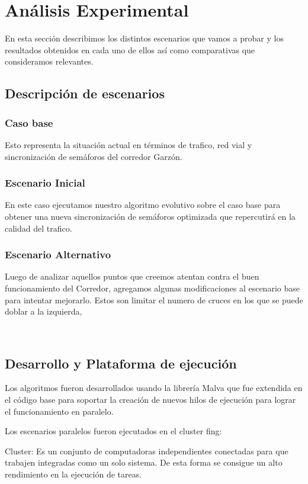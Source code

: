 \chapter{Análisis Experimental}
En esta sección describimos los distintos escenarios que vamos a probar y los resultados obtenidos en cada uno de ellos así como comparativas que consideramos relevantes.

\section{Descripción de escenarios}

\subsection{Caso base}
Esto representa la situación actual en términos de trafico, red vial y sincronización de semáforos del corredor Garzón. 

\subsection{Escenario Inicial }
En este caso ejecutamos nuestro algoritmo evolutivo sobre el caso base para obtener una nueva sincronización de semáforos optimizada que repercutirá en la calidad del trafico.

\subsection{Escenario Alternativo}
Luego de analizar aquellos puntos que creemos atentan contra el buen funcionamiento del Corredor, agregamos algunas modificaciones al escenario base para intentar mejorarlo. 
Estos son limitar el numero de cruces en los que se puede doblar a la izquierda, 

\

\section{Desarrollo y Plataforma de ejecución }
Los algoritmos fueron desarrollados usando la librería Malva que fue extendida en el código base para soportar la creación de nuevos hilos de ejecución para lograr el funcionamiento en paralelo.



Los escenarios paralelos fueron ejecutados en el cluster fing:

Cluster: Es un conjunto de computadoras independientes conectadas para que trabajen integradas como un solo sistema. De esta forma se consigue un alto rendimiento en la ejecución de tareas. 

